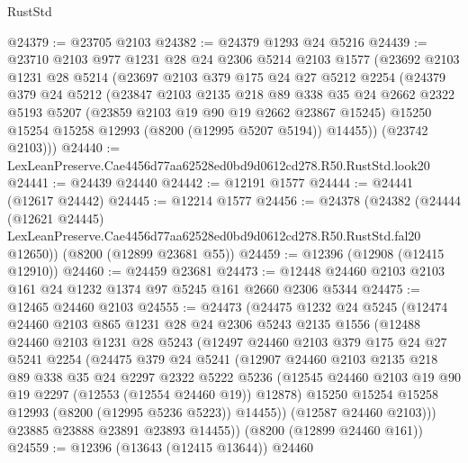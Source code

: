 \begin{lexlean}{RustStd}
\begin{coremodule}
@24379 := @23705 @2103
@24382 := @24379 @1293 @24 @5216
@24439 := @23710
    @2103
    @977
    @1231
    @28
    @24
    @2306
    @5214
    @2103
    @1577
    (@23692
      @2103
      @1231
      @28
      @5214
      (@23697
        @2103
        @379
        @175
        @24
        @27
        @5212
        @2254
        (@24379
          @379
          @24
          @5212
          (@23847
            @2103
            @2135
            @218
            @89
            @338
            @35
            @24
            @2662
            @2322
            @5193
            @5207
            (@23859 @2103 @19 @90 @19 @2662 @23867 @15245)
            @15250
            @15254
            @15258
            @12993
            (@8200 (@12995 @5207 @5194))
            @14455))
        (@23742 @2103)))
@24440 := LexLeanPreserve.Cae4456d77aa62528ed0bd9d0612cd278.R50.RustStd.look20
@24441 := @24439 @24440
@24442 := @12191 @1577
@24444 := @24441 (@12617 @24442)
@24445 := @12214 @1577
@24456 := @24378
    (@24382
      (@24444
        (@12621 @24445)
        LexLeanPreserve.Cae4456d77aa62528ed0bd9d0612cd278.R50.RustStd.fal20
        @12650))
    (@8200 (@12899 @23681 @55))
@24459 := @12396 (@12908 (@12415 @12910))
@24460 := @24459 @23681
@24473 := @12448 @24460 @2103 @2103 @161 @24 @1232 @1374 @97 @5245 @161 @2660 @2306 @5344
@24475 := @12465 @24460 @2103
@24555 := @24473
    (@24475
      @1232
      @24
      @5245
      (@12474
        @24460
        @2103
        @865
        @1231
        @28
        @24
        @2306
        @5243
        @2135
        @1556
        (@12488
          @24460
          @2103
          @1231
          @28
          @5243
          (@12497
            @24460
            @2103
            @379
            @175
            @24
            @27
            @5241
            @2254
            (@24475
              @379
              @24
              @5241
              (@12907
                @24460
                @2103
                @2135
                @218
                @89
                @338
                @35
                @24
                @2297
                @2322
                @5222
                @5236
                (@12545 @24460 @2103 @19 @90 @19 @2297 (@12553 (@12554 @24460 @19)) @12878)
                @15250
                @15254
                @15258
                @12993
                (@8200 (@12995 @5236 @5223))
                @14455))
            (@12587 @24460 @2103)))
        @23885
        @23888
        @23891
        @23893
        @14455))
    (@8200 (@12899 @24460 @161))
@24559 := @12396 (@13643 (@12415 @13644)) @24460

\end{coremodule}
\end{lexlean}
